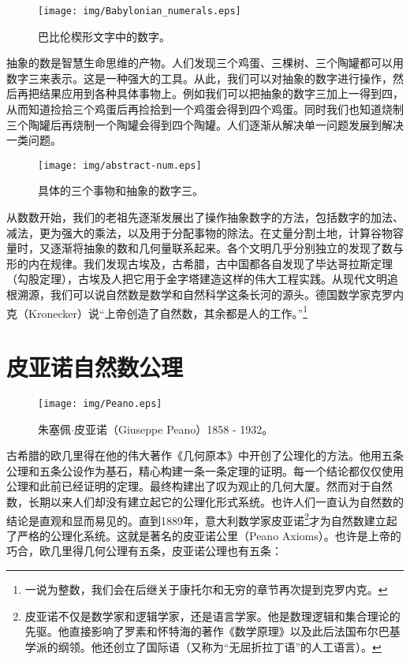\documentclass[UTF8]{article}
\begin{document}
\begin{figure}[htbp]
 \centering
 \texttt{[image: img/Babylonian\_numerals.eps]}
 \caption{巴比伦楔形文字中的数字\cite{wiki-babylonian-num}。}
 \label{fig:babylonian-num}
\end{figure}

抽象的数是智慧生命思维的产物。人们发现三个鸡蛋、三棵树、三个陶罐都可以用数字三来表示。这是一种强大的工具。从此，我们可以对抽象的数字进行操作，然后再把结果应用到各种具体事物上。例如我们可以把抽象的数字三加上一得到四，从而知道捡拾三个鸡蛋后再捡拾到一个鸡蛋会得到四个鸡蛋。同时我们也知道烧制三个陶罐后再烧制一个陶罐会得到四个陶罐。人们逐渐从解决单一问题发展到解决一类问题。

\begin{wrapfigure}{R}{0.5\textwidth}
 \centering
 \texttt{[image: img/abstract-num.eps]}
 \caption{具体的三个事物和抽象的数字三。}
 \label{fig:abstract-num}
\end{wrapfigure}

从数数开始，我们的老祖先逐渐发展出了操作抽象数字的方法，包括数字的加法、减法，更为强大的乘法，以及用于分配事物的除法。在丈量分割土地，计算谷物容量时，又逐渐将抽象的数和几何量联系起来。各个文明几乎分别独立的发现了数与形的内在规律。我们发现古埃及，古希腊，古中国都各自发现了毕达哥拉斯定理（勾股定理），古埃及人把它用于金字塔建造这样的伟大工程实践。从现代文明追根溯源，我们可以说自然数是数学和自然科学这条长河的源头。德国数学家克罗内克（Kronecker）说“上帝创造了自然数，其余都是人的工作。”\footnote{一说为整数，我们会在后继关于康托尔和无穷的章节再次提到克罗内克。}

\section{皮亚诺自然数公理}

\begin{figure}[htbp]
 \centering
 \texttt{[image: img/Peano.eps]}
 \caption{朱塞佩$\cdot$皮亚诺（Giuseppe Peano）1858 - 1932。}
 \label{fig:abstract-num}
\end{figure}

古希腊的欧几里得在他的伟大著作《几何原本》中开创了公理化的方法。他用五条公理和五条公设作为基石，精心构建一条一条定理的证明。每一个结论都仅仅使用公理和此前已经证明的定理。最终构建出了叹为观止的几何大厦。然而对于自然数，长期以来人们却没有建立起它的公理化形式系统。也许人们一直认为自然数的结论是直观和显而易见的。直到1889年，意大利数学家皮亚诺\footnote{皮亚诺不仅是数学家和逻辑学家，还是语言学家。他是数理逻辑和集合理论的先驱。他直接影响了罗素和怀特海的著作《数学原理》以及此后法国布尔巴基学派的纲领。他还创立了国际语（又称为“无屈折拉丁语”的人工语言）。}才为自然数建立起了严格的公理化系统。这就是著名的皮亚诺公里（Peano Axioms）。也许是上帝的巧合，欧几里得几何公理有五条，皮亚诺公理也有五条：
\end{document}
